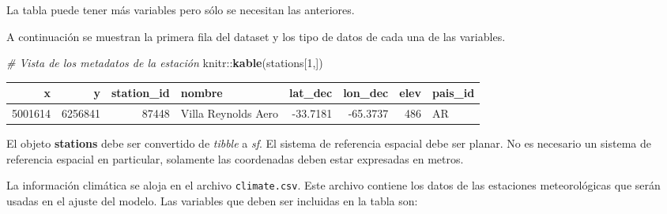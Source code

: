 \documentclass[
]{article}
\newenvironment{Shaded}{}{}
\newcommand{\CommentTok}[1]{\textcolor[rgb]{0.38,0.63,0.69}{\textit{#1}}}
\newcommand{\DataTypeTok}[1]{\textcolor[rgb]{0.56,0.13,0.00}{#1}}
\newcommand{\DecValTok}[1]{\textcolor[rgb]{0.25,0.63,0.44}{#1}}
\newcommand{\KeywordTok}[1]{\textcolor[rgb]{0.00,0.44,0.13}{\textbf{#1}}}
\newcommand{\NormalTok}[1]{#1}
\newcommand{\OperatorTok}[1]{\textcolor[rgb]{0.40,0.40,0.40}{#1}}
\newcommand{\StringTok}[1]{\textcolor[rgb]{0.25,0.44,0.63}{#1}}
\begin{document}
La tabla puede tener más variables pero sólo se necesitan las anteriores.

A continuación se muestran la primera fila del dataset y los tipo de datos de cada una de las variables.

\begin{Shaded}
\begin{Highlighting}[]
\CommentTok{# Vista de los metadatos de la estación}
\NormalTok{knitr}\OperatorTok{::}\KeywordTok{kable}\NormalTok{(stations[}\DecValTok{1}\NormalTok{,])}
\end{Highlighting}
\end{Shaded}

\begin{tabular}{r|r|r|l|r|r|r|l}
\hline
x & y & station\_id & nombre & lat\_dec & lon\_dec & elev & pais\_id\\
\hline
5001614 & 6256841 & 87448 & Villa Reynolds Aero & -33.7181 & -65.3737 & 486 & AR\\
\hline
\end{tabular}

El objeto \textbf{stations} debe ser convertido de \emph{tibble} a \emph{sf}. El sistema de referencia espacial debe ser planar. No es necesario un sistema de referencia espacial en particular, solamente las coordenadas deben estar expresadas en metros.

\begin{Shaded}
\end{Shaded}

La información climática se aloja en el archivo \texttt{climate.csv}. Este archivo contiene los datos de las estaciones meteorológicas que serán usadas en el ajuste del modelo. Las variables que deben ser incluidas en la tabla son:
\end{document}
